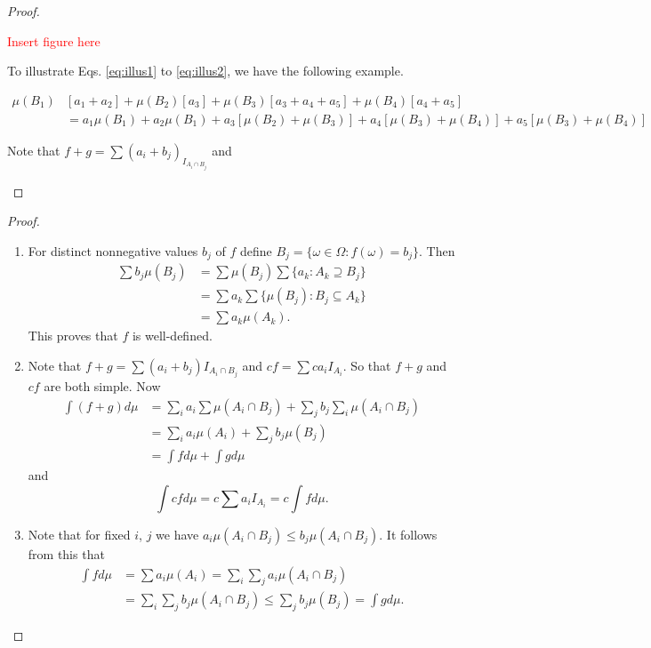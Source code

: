 \begin{proof}
\begin{prooflist}
\begin{example}
	\textcolor{red}{Insert figure here}
\end{example}

To illustrate Eqs. \ref{eq:illus1} to \ref{eq:illus2}, we have the following example.

\begin{example}
\begin{align*}
\mu(B_1)&[a_1+a_2]+\mu(B_2)[a_3]+\mu(B_3)[a_3+a_4+a_5]+\mu(B_4)[a_4+a_5]\\
	&=a_1\mu(B_1)+a_2\mu(B_1)+a_3[\mu(B_2)+\mu(B_3)]+a_4[\mu(B_3)+\mu(B_4)]+a_5[\mu(B_3)+\mu(B_4)]
\end{align*}

\end{example}

\item Note that $f+g=\sum(a_i+b_j)_{I_{A_i\cap B_j}}$ and 

\end{prooflist}
\end{proof}







\begin{proof}
\begin{enumerate}
\item For distinct nonnegative values $b_j$ of $f$ define $B_j=\{\omega\in\Omega:f(\omega)=b_j \}$. Then
\begin{align*}
\sum b_j\mu(B_j)&=\sum\mu(B_j)\sum\{a_k: A_k\supseteq B_j \}\\
	&=\sum a_k\sum\{\mu(B_j): B_j\subseteq A_k \}\\
	&=\sum a_k \mu(A_k).
\end{align*}
This proves that $f$ is well-defined.

\item Note that $f+g=\sum(a_i+b_j)I_{A_i\cap B_j}$ and $cf=\sum ca_iI_{A_i}$. So that $f+g$ and $cf$ are both simple. Now
\begin{align*}
\int(f+g)d\mu&=\sum_i a_i \sum\mu(A_i\cap B_j)+\sum_j b_j\sum_i\mu(A_i\cap B_j)\\
	&=\sum_i a_i\mu(A_i)+\sum_j b_j\mu(B_j)\\
	&=\int fd\mu+\int gd\mu
\end{align*}
and
\begin{equation*}
\int cfd\mu = c\sum a_iI_{A_i}=c\int fd\mu.
\end{equation*}

\item Note that for fixed $i$, $j$ we have $a_i\mu(A_i\cap B_j)\leq b_j\mu(A_i\cap B_j)$. It follows from this that
\begin{align*}
\int fd\mu&=\sum a_i\mu(A_i)=\sum_i\sum_j a_i\mu(A_i\cap B_j)\\
	&=\sum_i\sum_j b_j\mu(A_i\cap B_j)\leq \sum_j b_j\mu(B_j)=\int gd\mu.
\end{align*}
\end{enumerate}
\end{proof}


